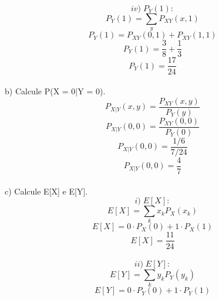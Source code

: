 \documentclass[a4paper]{article}
\begin{document}
\begin{equation}
	iv) \; P_Y(1):
\end{equation}
\begin{equation}
	P_Y(1) = \sum_{y} P_{XY}(x,1)
\end{equation}
\begin{equation}
	P_Y(1) = P_{XY}(0,1) + P_{XY}(1,1)
\end{equation}
\begin{equation}
	P_Y(1) = \frac{3}{8} + \frac{1}{3}
\end{equation}
\begin{equation}
	P_Y(1) = \frac{17}{24}
\end{equation}
\\
b) Calcule P(X = 0|Y = 0).
\begin{equation}
	P_{X|Y}(x,y) = \frac{P_{XY}(x,y)}{P_Y(y)}
\end{equation}
\begin{equation}
	P_{X|Y}(0,0) = \frac{P_{XY}(0,0)}{P_Y(0)}
\end{equation}
\begin{equation}
	P_{X|Y}(0,0) = \frac{1/6}{7/24}
\end{equation}
\begin{equation}
	P_{X|Y}(0,0) = \frac{4}{7}
\end{equation}
\\
c) Calcule E[X] e E[Y].
\begin{equation}
	i) \; E[X]:
\end{equation}
\begin{equation}
	E[X] = \sum_{k} x_k P_X(x_k)
\end{equation}
\begin{equation}
	E[X] = 0 \cdot P_X(0) + 1 \cdot P_X(1)
\end{equation}
\begin{equation}
	E[X] = \frac{11}{24}
\end{equation}
\\
\begin{equation}
	ii) \; E[Y]:
\end{equation}
\begin{equation}
	E[Y] = \sum_{k} y_k P_Y(y_k)
\end{equation}
\begin{equation}
	E[Y] = 0 \cdot P_Y(0) + 1 \cdot P_Y(1)
\end{equation}
\end{document}
